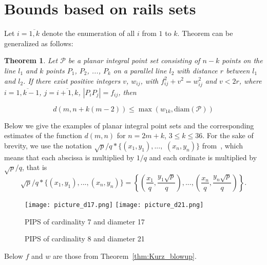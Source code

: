 \documentclass[12pt]{article}
\theoremstyle{theorem}
\newtheorem{theorem}{Theorem}
\theoremstyle{dfn}
\theoremstyle{remark}
\begin{document}

\section{Bounds based on rails sets}

Let $i = \overline{1, k}$ denote the enumeration of all $i$
from $1$ to $k$.
Theorem \cite[Theorem 2.1]{kurz2008bounds} can be generalized as follows:

\begin{theorem}
	\label{thm:rails_blowup}
	Let $\mathcal{P}$ be a planar integral point set consisting of
	$n - k$ points on the line $l_1$ and $k$ points $P_1$, $P_2$, ..., $P_k$ on a
	parallel line $l_2$ with distance $r$ between $l_1$ and $l_2$. If there
	exist positive integers $v$, $w_{ij}$, with $f_{ij}^{2} + v^{2}
	= w_{ij}^{2}$ and $v < 2r$, where $i = \overline{1, k - 1}$, $j =
	\overline{i + 1, k}$, $|P_{i}P_{j}| = f_{ij}$,
	then

	\begin{equation}
		d(m, n + k(m - 2)) \leq \max(w_{1k}, \operatorname{diam(\mathcal{P})})
	\end{equation}

\end{theorem}

Below we give the examples of planar integral point sets and the corresponding
estimates of the function $d(m, n)$ for $n = 2m + k$, $3 \leq k \leq 36$.
For the sake of brevity, we use the notation
$\sqrt{p}/q * \{ (x_1,y_1), ...,$ $ (x_n, y_n)  \}$
from~\cite{our-ped-2018,our-pmm-2018,our-vmmsh-2018},
which means that each abscissa is multiplied by $1/q$
and each ordinate is multiplied by $\sqrt{p}/q$,  that is
$$
	\sqrt{p}/q * \{ (x_1,y_1), ..., (x_n, y_n)  \}
	=
	\left\{ \left(\frac{x_1}{q},\frac{y_1\sqrt{p}}{q}\right), ..., \left(\frac{x_n}{q},   \frac{y_n\sqrt{p}}{q}\right)  \right\}.
$$


\begin{figure}[htbp]
	\texttt{[image: picture\_d17.png]}
	\hfill
	\texttt{[image: picture\_d21.png]}
	\\
	\parbox{.48\linewidth}{\caption{PIPS of cardinality 7 and diameter 17}
	\label{picture_d17.png}}
	\hfill
	\parbox{.48\linewidth}{\caption{PIPS of cardinality 8 and diameter 21}
	\label{picture_d21.png}}
\end{figure}

Below $f$ and $w$ are those from Theorem~\ref{thm:Kurz_blowup}.
\end{document}
